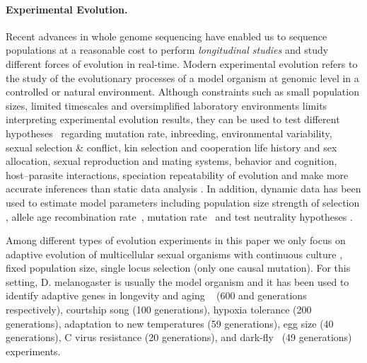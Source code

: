 \documentclass[11pt]{article}
\begin{document}
\paragraph{Experimental Evolution.}
Recent advances in whole genome sequencing have enabled us to sequence 
populations at a reasonable cost to perform \emph{longitudinal studies} and  study different forces of evolution in real-time. Modern experimental 
evolution refers to the study of the evolutionary processes of a model organism 
at genomic level in a 
controlled  
\cite{hegreness2006equivalence,lang2013pervasive,orozco2012adaptation,
	lang2011genetic,barrick2009genome,bollback2007clonal,oz2014strength} 
or natural 
\cite{maldarelli2013hiv,reid2011new,denef2012situ,winters2012development,
	daniels2013genetic,barrett2008natural,bergland2014genomic} environment.
Although constraints such as small population sizes, limited 
timescales and oversimplified laboratory
environments limits interpreting experimental evolution results, they can 
be used to test different hypotheses~\cite{kawecki2012experimental}
regarding
mutation rate, 
inbreeding, 
environmental variability,
sexual selection \& conflict, 
kin selection and cooperation
life history and sex allocation, 
sexual reproduction and mating systems, 
behavior and cognition, 
host–parasite interactions, 
speciation repeatability of evolution 
and make more accurate inferences 
than static data analysis 
\cite{boyko2008assessing,desai2008polymorphism,sawyer1992population}. In 
addition, dynamic data has been used to estimate model parameters 
including population size
\cite{williamson1999using,wang2001pseudo,pollak1983new,waples1989generalized,
	Terhorst2015Multi}
strength of selection
\cite{mathieson2013estimating,illingworth2011distinguishing,Terhorst2015Multi,
	bollback2008estimation,illingworth2012quantifying,malaspinas2012estimating,
	Steinrücken2014a}, allele age
\cite{malaspinas2012estimating}
recombination rate~\cite{Terhorst2015Multi}, mutation
rate~\cite{Barrick2013Genome, Terhorst2015Multi} and test neutrality hypotheses 
\cite{feder2014Identifying,Terhorst2015Multi,burke2010genome,bergland2014genomic}.

Among different types of evolution experiments 
\cite{Barrick2013Genome,schlotterer2015combining} in 
this 
paper we only focus on adaptive evolution of multicellular sexual organisms 
with 
continuous culture
, fixed population size, single locus selection (only one 
causal mutation). 
For this setting, D. melanogaster is 
usually the model organism and it has been used to identify adaptive genes in 
longevity and aging ~\cite{burke2010genome,remolina2012genomic} (600 and  
generations respectively),
courtship song \cite{turner2011population} (100 generations),
hypoxia tolerance \cite{zhou2011experimental} (200 generations),
adaptation to new temperatures\cite{orozco2012adaptation,tobler2014massive} (59 
generations),
egg size \cite{jha2015whole} (40 generations),
C virus resistance \cite{martins2014host} (20 generations),
and dark-fly~\cite{izutsu2015dynamics} (49 generations) experiments.
\end{document}
